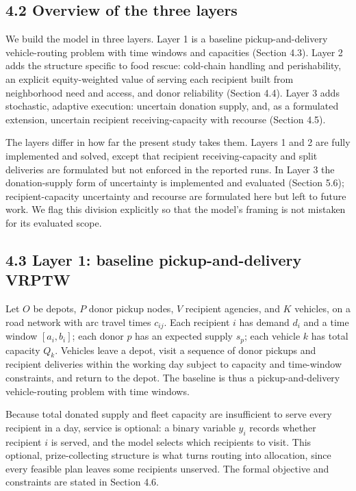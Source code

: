 \documentclass[
  11pt,
]{article}
\begin{document}
\subsection{4.2 Overview of the three
layers}\label{overview-of-the-three-layers}

We build the model in three layers. Layer 1 is a baseline
pickup-and-delivery vehicle-routing problem with time windows and
capacities (Section 4.3). Layer 2 adds the structure specific to food
rescue: cold-chain handling and perishability, an explicit
equity-weighted value of serving each recipient built from neighborhood
need and access, and donor reliability (Section 4.4). Layer 3 adds
stochastic, adaptive execution: uncertain donation supply, and, as a
formulated extension, uncertain recipient receiving-capacity with
recourse (Section 4.5).

The layers differ in how far the present study takes them. Layers 1 and
2 are fully implemented and solved, except that recipient
receiving-capacity and split deliveries are formulated but not enforced
in the reported runs. In Layer 3 the donation-supply form of uncertainty
is implemented and evaluated (Section 5.6); recipient-capacity
uncertainty and recourse are formulated here but left to future work. We
flag this division explicitly so that the model's framing is not
mistaken for its evaluated scope.

\subsection{4.3 Layer 1: baseline pickup-and-delivery
VRPTW}\label{layer-1-baseline-pickup-and-delivery-vrptw}

Let \(O\) be depots, \(P\) donor pickup nodes, \(V\) recipient agencies,
and \(K\) vehicles, on a road network with arc travel times \(c_{ij}\).
Each recipient \(i\) has demand \(d_i\) and a time window
\([a_i, b_i]\); each donor \(p\) has an expected supply \(s_p\); each
vehicle \(k\) has total capacity \(Q_k\). Vehicles leave a depot, visit
a sequence of donor pickups and recipient deliveries within the working
day subject to capacity and time-window constraints, and return to the
depot. The baseline is thus a pickup-and-delivery vehicle-routing
problem with time windows.

Because total donated supply and fleet capacity are insufficient to
serve every recipient in a day, service is optional: a binary variable
\(y_i\) records whether recipient \(i\) is served, and the model selects
which recipients to visit. This optional, prize-collecting structure is
what turns routing into allocation, since every feasible plan leaves
some recipients unserved. The formal objective and constraints are
stated in Section 4.6.
\end{document}
